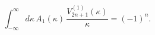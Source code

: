 \begin{equation}
\int_{-\infty}^{\infty}d\kappa\,A_1(\kappa)\,
\frac{V_{2n+1}^{(1)}(\kappa)}{\kappa}= (-1)^n.
\label{C5}
\end{equation}

